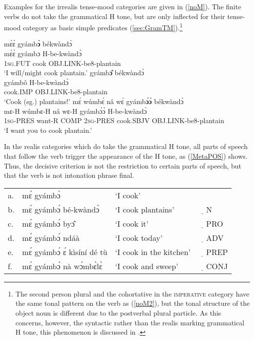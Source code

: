 Examples for the irrealis tense-mood categories are given in (\ref{noM}). The finite verbs do not take the grammatical H tone, but are only inflected for their tense-mood category as basic simple predicates (\ref{sec:GramTM}).\footnote{The second person plural and the cohortative in the \textsc{imperative} category have the same tonal pattern on the verb as (\ref{noM2}), but the tonal structure of the object noun is different due to the postverbal plural particle. As this concerns, however, the syntactic rather than the realis marking grammatical H tone, this phenomenon is discussed in .}

\begin{exe}
\ex\label{noM}
\begin{xlist}
\ex \label{noM1}
  \glll  mɛ̀ɛ̀ gyámb{\bfseries ɔ̀} békwàndɔ̀ \\
          mɛ̀ɛ̀ gyámbɔ H-be-kwàndɔ̀ \\
         1\textsc{sg}.FUT cook OBJ.LINK-be8-plantain  \\
    \trans `I will/might cook plantain.'
\ex\label{noM2}
  \glll   gyámb{\bfseries ɔ̂} békwàndɔ̀ \\
        gyámbô H-be-kwàndɔ̀ \\
          cook.IMP OBJ.LINK-be8-plantain  \\
    \trans `Cook (sg.) plantains!'
\ex\label{noM3}
  \glll   mɛ́ wúmbɛ́ nâ wɛ́ gyámb{\bfseries ɔ́ɔ̀} békwàndɔ̀\\
         mɛ-H wúmbɛ-H nâ wɛ-H gyámbɔ́ɔ̀ H-be-kwàndɔ̀ \\
          1\textsc{sg}-PRES want-R COMP 2\textsc{sg}-PRES cook.SBJV OBJ.LINK-be8-plantain \\
    \trans `I want you to cook plantain.'
\end{xlist}
\end{exe}




In the realis categories which do take the grammatical H tone, all parts of speech that follow the verb trigger the appearance of the H tone, as (\ref{MetaPOS}) shows. Thus, the decisive criterion is not the restriction to certain parts of speech, but that the verb is not intonation phrase final.

\begin{exe}
\ex\label{MetaPOS}
\begin{tabular}{llll}
a. & mɛ́ gyámbɔ̀ &  `I cook' & \\
b. &  mɛ́ gyámbɔ́ bé-kwàndɔ̀&  `I cook plantains' &  $\underline{\quad}$N \\
c. &   mɛ́ gyámbɔ́ byɔ̂ &  `I cook it' & $\underline{\quad}$PRO \\
d. &  mɛ́ gyámbɔ́ ndáà &   `I cook today' &  $\underline{\quad}$ADV \\
e. &   mɛ́ gyámbɔ́ ɛ́ kìsíní dé tù &   `I cook in the kitchen' &  $\underline{\quad}$PREP \\
f. & mɛ́ gyámbɔ́ nà wɔ́mbɛ̀lɛ̀ &  `I cook and sweep' &  $\underline{\quad}$CONJ \\
\end{tabular}
\end{exe}

